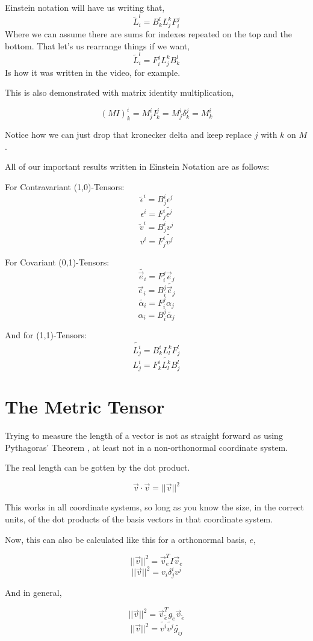 \documentclass[12pt]{book}
\theoremstyle{plain}
\theoremstyle{definition}
\theoremstyle{ppart}
\theoremstyle{case}
\theoremstyle{solution}
\begin{document}
Einstein notation will have us writing that,
\[ \widetilde{L}^l_i =  B^l_k L^k_j F^j_i \] 
Where we can assume there are sums for indexes repeated on the top and the bottom.
That let's us rearrange things if we want,
\[ \widetilde{L}^l_i =  F^j_i L^k_j B^l_k \] 
Is how it was written in the video, for example.

This is also demonstrated with matrix identity multiplication,

\[ (M I)^i_k = M^i_j I^j_k = M^i_j \delta^j_k = M^i_k \] 

Notice how we can just drop that kronecker delta and keep replace $j$ with $k$ on $M$.

All of our important results written in Einstein Notation are as follows:

\label{einstein_notation}
For Contravariant (1,0)-Tensors:
\[ \widetilde{\epsilon}^i = B^i_j \epsilon^j \]
\[ \epsilon^i = F^i_j \widetilde{\epsilon^j} \]
\[ \widetilde{v}^i = B^i_j v^j \]
\[ v^i = F^i_j \widetilde{v^j} \]

For Covariant (0,1)-Tensors:
\[ \widetilde{\vec{e}_i} = F^j_i \vec{e}_j \]
\[ \vec{e}_i = B^j_i \widetilde{\vec{e}_j} \]
\[ \widetilde{\alpha_i} = F^j_i \alpha_j \]
\[ \alpha_i = B^j_i \widetilde{\alpha_j} \]

And for (1,1)-Tensors:
\[ \widetilde{L^i_j} = B^i_k L^k_l F^l_j \]
\[ L^i_j = F^i_k \widetilde{L^k_l} B^l_j \]

\chapter{The Metric Tensor}

Trying to measure the length of a vector is not as straight forward
as using Pythagoras' Theorem \cite{youtube:tensor8}, at least not in a non-orthonormal coordinate system.

The real length can be gotten by the dot product.

\[ \vec{v} \cdot \vec{v} = ||\vec{v}||^2 \]

This works in all coordinate systems, so long as you know the size, in the correct units, of
the dot products of the basis vectors in that coordinate system.

Now, this can also be calculated like this for a orthonormal basis, $e$,

\[ ||\vec{v}||^2 = \vec{v}^T_e I \vec{v}_e \]
\[ ||\vec{v}||^2 = v_i \delta^i_j v^j \]

And in general,

\label{length}
\[ ||\vec{v}||^2 = \vec{v}^T_{\widetilde{e}} g_{\widetilde{e}} \vec{v}_{\widetilde{e}} \]
\[ ||\vec{v}||^2 = \widetilde{v^i} \widetilde{v^j} \widetilde{g_{ij}} \]
\end{document}

